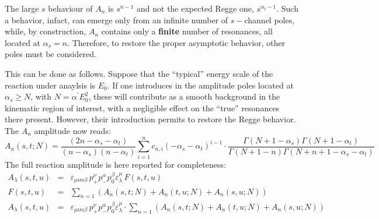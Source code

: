 \documentclass[a4paper,10pt]{report}
\begin{document}
The large $s$ behaviour of $A_{n}$ is $s^{n-1}$ and not the expected Regge one, $s^{\alpha_t-1}$. Such a behavior, infact, can emerge only from an infinite number of $s-$channel poles,
while, by construction, $A_{n}$ contains only a \textbf{finite} number of resonances, all located at $\alpha_s=n$. 
Therefore, to restore the proper asymptotic behavior, other poles must be considered. 

This can be done as follows.  Suppose that the ``typical'' energy scale of the reaction under anaylsis is $E_0$. If one introduces in the amplitude poles located at $\alpha_s \geq N$, 
with $N=\alpha^{\prime}E^2_0$, these will contribute as a smooth background in the kinematic region of interest, with a negligible effect on the ``true'' resonances there present.
However, their introduction permits to restore the Regge behavior. The $A_n$ amplitude now reads:
\begin{equation}
A_{n}(s,t;N)=\frac{(2n-\alpha_s-\alpha_t)}{(n-\alpha_s)(n-\alpha_t)}\sum_{i=1}^n c_{n,i} (-\alpha_s-\alpha_t)^{i-1}
\cdot
\frac{\Gamma(N+1-\alpha_s)\Gamma(N+1-\alpha_t)}{\Gamma(N+1-n)\Gamma(N+n+1-\alpha_s-\alpha_t)}
\end{equation}
The full reaction amplitude is here reported for completeness:
\begin{eqnarray}\label{eq:fullampl}
A_\lambda(s,t,u) & = & \varepsilon_{\mu \nu \alpha \beta}\, p^{\nu}_{+}p^{\alpha}_{-}p^{\beta}_{0}\varepsilon^{\mu}_{\lambda} \, F(s,t,u) 
\\
F(s,t,u) & = & \sum_{n=1}(A_{n}(s,t;N)+A_{n}(t,u;N)+A_{n}(s,u;N))
\\
A_\lambda(s,t,u) & = &
\varepsilon_{\mu \nu \alpha \beta}\, p^{\nu}_{+}p^{\alpha}_{-}p^{\beta}_{0}\varepsilon^{\mu}_{\lambda}
\cdot
\sum_{n=1}(A_{n}(s,t;N)+A_{n}(t,u;N)+A_{n}(s,u;N))
\end{eqnarray}
\end{document}
